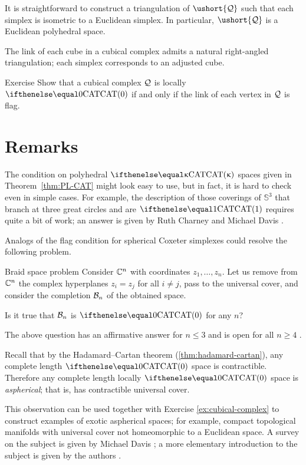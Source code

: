 It is straightforward to construct a triangulation 
of $\ushort{\spc{Q}}$ 
such that each simplex is isometric to a Euclidean simplex.
In particular, $\ushort{\spc{Q}}$ is a Euclidean polyhedral space.

The link of each cube in a cubical complex admits a natural right-angled triangulation; 
each simplex corresponds to an adjusted cube.

\begin{thm}{Exercise}\label{ex:cubical-complex}
Show that a cubical complex $\mathcal{Q}$ is locally $\CAT0$ if and only if the link of each vertex in $\mathcal{Q}$ is flag.
\end{thm}

\section{Remarks}\label{sec:poly-reamarks}

The condition on polyhedral $\CAT\kappa$ spaces given in Theorem~\ref{thm:PL-CAT} might look easy to use, 
but in fact, it is hard to check even in simple cases.
For example, the description of those coverings of $\mathbb{S}^3$ that branch at three 
great circles and are $\CAT1$ requires quite a bit of work;
an answer is given by Ruth Charney and Michael Davis \cite{charney-davis-1993}.

Analogs of the flag condition for spherical Coxeter simplexes
could resolve the following problem. 

\begin{thm}{Braid space problem}
Consider $\mathbb{C}^n$ with coordinates $z_1,\dots,z_n$.
Let us remove from $\mathbb{C}^n$ the complex hyperplanes $z_i=z_j$ for all $i\ne j$,
pass to the universal cover, and consider the completion $\mathcal{B}_n$ 
of the obtained space.

Is it true that $\mathcal{B}_n$ is $\CAT0$ for any $n$?
\end{thm}

The above question has an affirmative answer for $n\le 3$ and is open for all $n\ge 4$ \cite{charney-davis-1993,panov-petrunin}.

Recall that by the Hadamard--Cartan theorem (\ref{thm:hadamard-cartan}), 
any complete length $\CAT{0}$ space is contractible.
Therefore any complete length locally $\CAT{0}$ space 
is \emph{aspherical};
that is, has contractible universal cover.

This observation can be used together with Exercise \ref{ex:cubical-complex} to construct examples of exotic aspherical spaces;
for example, compact topological manifolds with universal cover not homeomorphic to a Euclidean space.
A survey on the subject is given by Michael Davis \cite{davis-2001}; a more elementary introduction to the subject is given by the authors \cite[Chapter 3]{alexander-kapovitch-petrunin-CAT}.


